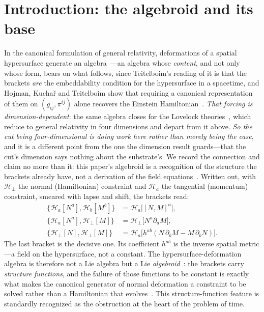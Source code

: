 \documentclass[11pt,a4paper]{article}
\theoremstyle{plain}
\theoremstyle{definition}
\theoremstyle{remark}
\newcommand{\Hc}{\mathcal{H}}
\begin{document}
\section{Introduction: the algebroid and its base}\label{sec:intro}

In the canonical formulation of general relativity, deformations of a spatial hypersurface generate an algebra~\cite{Dirac1964,ADM1962,Teitelboim1973}---an algebra whose \emph{content}, and not only whose form, bears on what follows, since Teitelboim's reading of it is that the brackets \emph{are} the embeddability condition for the hypersurface in a spacetime, and Hojman, Kucha\v{r} and Teitelboim show that requiring a canonical representation of them on $(g_{ij},\pi^{ij})$ alone recovers the Einstein Hamiltonian~\cite{HKT1976}. \emph{That forcing is dimension-dependent}: the same algebra closes for the Lovelock theories~\cite{TeitelboimZanelli1987}, which reduce to general relativity in four dimensions and depart from it above. \emph{So the cut being four-dimensional is doing work here rather than merely being the case}, and it is a different point from the one the dimension result guards---that the cut's dimension says nothing about the substrate's. We record the connection and claim no more than it: this paper's algebroid is a recognition of the structure the brackets already have, not a derivation of the field equations~\cite{JanzenRange}. Written out, with $\Hc_\perp$ the normal (Hamiltonian) constraint and $\Hc_a$ the tangential (momentum) constraint, smeared with lapse and shift, the brackets read:
\begin{align}
\{\Hc_a[N^a],\Hc_b[M^b]\} &= \Hc_a\bigl[[N,M]^a\bigr],\\
\{\Hc_a[N^a],\Hc_\perp[M]\} &= \Hc_\perp\bigl[N^a\partial_a M\bigr],\\
\{\Hc_\perp[N],\Hc_\perp[M]\} &= \Hc_a\bigl[h^{ab}(N\,\partial_b M-M\,\partial_b N)\bigr].\label{eq:HH}
\end{align}
The last bracket is the decisive one. Its coefficient $h^{ab}$ is the inverse spatial metric---a field on the hypersurface, not a constant. The hypersurface-deformation algebra is therefore not a Lie algebra but a Lie \emph{algebroid}~\cite{Mackenzie2005}: the brackets carry \emph{structure functions}, and the failure of those functions to be constant is exactly what makes the canonical generator of normal deformation a constraint to be solved rather than a Hamiltonian that evolves~\cite{Kuchar1992,Isham1993,BojowaldHDA}. This structure-function feature is standardly recognized as the obstruction at the heart of the problem of time.
\end{document}
